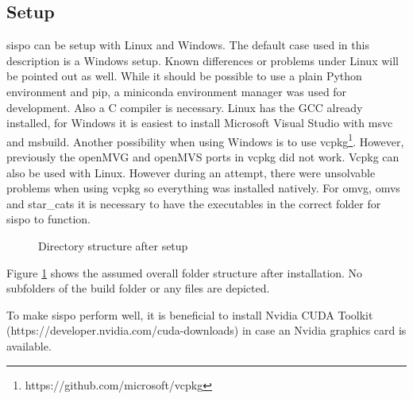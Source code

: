 \subsection{Setup}
\gls{sispo} can be setup with Linux and Windows. The default case used in this description is a Windows setup. Known differences or problems under Linux will be pointed out as well. While it should be possible to use a plain Python environment and pip, a miniconda environment manager was used for development. Also a C compiler is necessary. Linux has the GCC already installed, for Windows it is easiest to install Microsoft Visual Studio with \gls{msvc} and \gls{msbuild}. Another possibility when using Windows is to use vcpkg\footnote{https://github.com/microsoft/vcpkg}. However, previously the openMVG and openMVS ports in vcpkg did not work. Vcpkg can also be used with Linux. However during an attempt, there were unsolvable problems when using vcpkg so everything was installed natively.
For \gls{omvg}, \gls{omvs} and star\_cats it is necessary to have the executables in the correct folder for \gls{sispo} to function. \newline

\begin{figure}
    \caption{Directory structure after setup}
    \label{fig:dir_tree}
\end{figure}
Figure \ref{fig:dir_tree} shows the assumed overall folder structure after installation. No subfolders of the build folder or any files are depicted. 

To make \gls{sispo} perform well, it is beneficial to install Nvidia CUDA Toolkit (https://developer.nvidia.com/cuda-downloads) in case an Nvidia graphics card is available.

